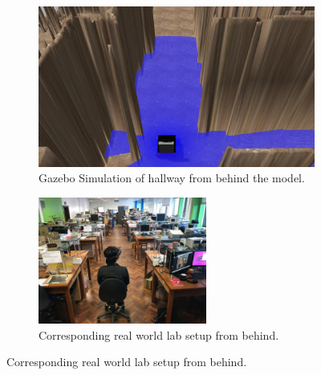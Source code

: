 \begin{figure}[ht!]
	\begin{subfigure}[b]{.48\textwidth}
		\centering
		\includegraphics[width=1.0\linewidth]{img/chapter6_test/gazeboBack.jpg}
		\caption{Gazebo Simulation of hallway from behind the model.}
	\end{subfigure}%
	\hspace{\fill} 
	\begin{subfigure}[b]{.48\textwidth}
		\centering
		\includegraphics[width=1.0\linewidth,height=41.5mm]{img/chapter6_test/realBack.jpg}
		\caption{Corresponding real world lab setup from behind.}
	\end{subfigure}


\end{figure}
